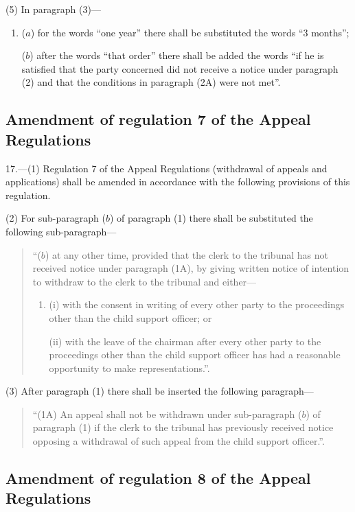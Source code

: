 \documentclass[a4paper]{article}
\begin{document}
(5) In paragraph (3)—
\begin{enumerate}\item[]
($a$) for the words “one year” there shall be substituted the words “3 months”;

($b$) after the words “that order” there shall be added the words “if he is satisfied that the party concerned did not receive a notice under paragraph (2) and that the conditions in paragraph (2A) were not met”.
\end{enumerate}

\subsection[17. Amendment of regulation 7 of the Appeal Regulations]{Amendment of regulation 7 of the Appeal Regulations}

17.—(1) Regulation 7 of the Appeal Regulations (withdrawal of appeals and applications) shall be amended in accordance with the following provisions of this regulation.

(2) For sub-paragraph ($b$) of paragraph (1) there shall be substituted the following sub-paragraph—
\begin{quotation}
“($b$) at any other time, provided that the clerk to the tribunal has not received notice under paragraph (1A), by giving written notice of intention to withdraw to the clerk to the tribunal and either—
\begin{enumerate}\item[]
(i) with the consent in writing of every other party to the proceedings other than the child support officer; or

(ii) with the leave of the chairman after every other party to the proceedings other than the child support officer has had a reasonable opportunity to make representations.”.
\end{enumerate}
\end{quotation}

(3) After paragraph (1) there shall be inserted the following paragraph—
\begin{quotation}
“(1A) An appeal shall not be withdrawn under sub-paragraph ($b$) of paragraph (1) if the clerk to the tribunal has previously received notice opposing a withdrawal of such appeal from the child support officer.”.
\end{quotation}

\subsection[18. Amendment of regulation 8 of the Appeal Regulations]{Amendment of regulation 8 of the Appeal Regulations}
\end{document}
